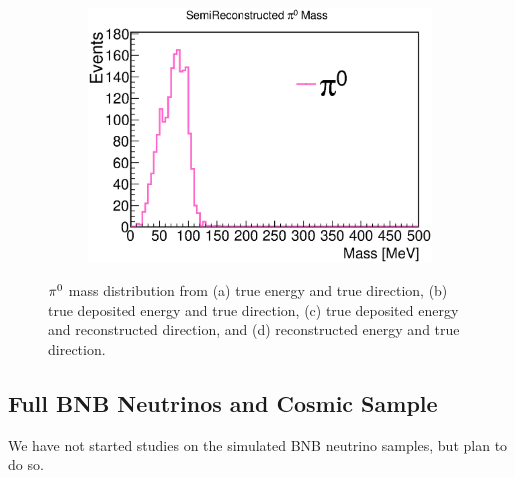 \begin{figure}[htbp]
\begin{center}
\begin{subfigure}{0.45\textwidth}
\caption{}
\end{subfigure}
\begin{subfigure}{0.45\textwidth}
\includegraphics[width=0.9\linewidth]{figs/mc/single_pi0/RecoEMCThetaPi0Mass.eps}
\caption{}
\end{subfigure}
\caption{${\pi}^0$ mass distribution from (a) true energy and true direction,
(b) true deposited energy and true direction, (c) true deposited energy
and reconstructed direction, and (d) reconstructed energy and true direction.}
\label{fig:mc_reco_single_pi0}
\end{center}
\end{figure}
\subsection{Full BNB Neutrinos and Cosmic Sample}
\label{sec:bnb}

We have not started studies on the simulated BNB neutrino samples,
but plan to do so.


